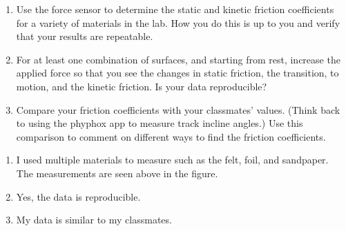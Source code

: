 \documentclass[idxtotoc,hyperref,openany]{labbook} %
\begin{document}

\begin{enumerate}
    \item Use the force sensor to determine the static and kinetic friction coefficients for a variety of materials in the lab. How you do this is up to you and verify that your results are repeatable.
    \item For at least one combination of surfaces, and starting from rest, increase the applied force so that you see the changes in static friction, the transition, to motion, and the kinetic friction. Is your data reproducible?
    \item Compare your friction coefficients with your classmates’ values. (Think back to using the phyphox app to measure track incline angles.) Use this comparison to comment on different ways to find the friction coefficients.
\end{enumerate}


\begin{enumerate}
    \item I used multiple materials to measure such as the felt, foil, and sandpaper. The measurements are seen above in the figure.
    \item Yes, the data is reproducible.
    \item My data is similar to my classmates.
\end{enumerate}

\end{document}
